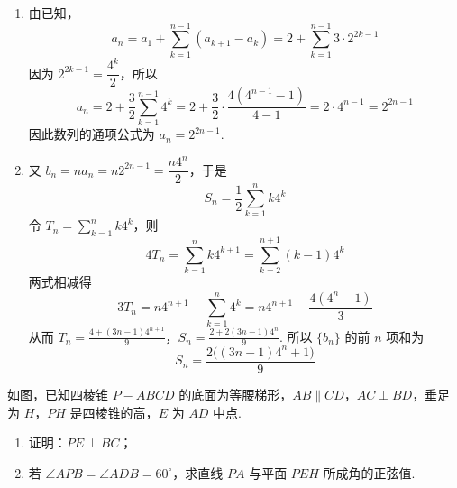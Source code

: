 \begin{solution}
\begin{enumerate}
\item
由已知，
\[
a_n=a_1+\sum_{k=1}^{n-1}(a_{k+1}-a_k)
=2+\sum_{k=1}^{n-1}3\cdot 2^{2k-1}
\]
因为 \(2^{2k-1}=\dfrac{4^k}{2}\)，所以
\[
a_n=2+\frac{3}{2}\sum_{k=1}^{n-1}4^k
=2+\frac{3}{2}\cdot\frac{4(4^{n-1}-1)}{4-1}
=2\cdot 4^{n-1}=2^{2n-1}
\]
因此数列的通项公式为 \(a_n=2^{2n-1}\).

\item
又 \(b_n=na_n=n2^{2n-1}=\dfrac{n4^n}{2}\)，于是
\[
S_n=\frac{1}{2}\sum_{k=1}^{n}k4^k
\]
令 \(T_n=\sum_{k=1}^{n}k4^k\)，则
\[
4T_n=\sum_{k=1}^{n}k4^{k+1}=\sum_{k=2}^{n+1}(k-1)4^k
\]
两式相减得
\[
3T_n=n4^{n+1}-\sum_{k=1}^{n}4^k
=n4^{n+1}-\frac{4(4^n-1)}{3}
\]
从而
\(T_n=\frac{4+(3n-1)4^{n+1}}{9}\)，\(S_n=\frac{2+2(3n-1)4^n}{9}\).
所以 \(\{b_n\}\) 的前 \(n\) 项和为
\[
S_n=\frac{2\bigl((3n-1)4^n+1\bigr)}{9}
\]
\end{enumerate}
\end{solution}

\begin{problem}
如图，已知四棱锥 \(P - ABCD\) 的底面为等腰梯形，\(AB \parallel CD\)，\(AC \perp BD\)，垂足为 \(H\)，\(PH\) 是四棱锥的高，\(E\) 为 \(AD\) 中点.

\begin{enumerate}
\item 证明：\(PE \perp BC\)；
\item 若 \(\angle APB = \angle ADB = 60^{\circ}\)，求直线 \(PA\) 与平面 \(PEH\) 所成角的正弦值.
\end{enumerate}


\end{problem}

